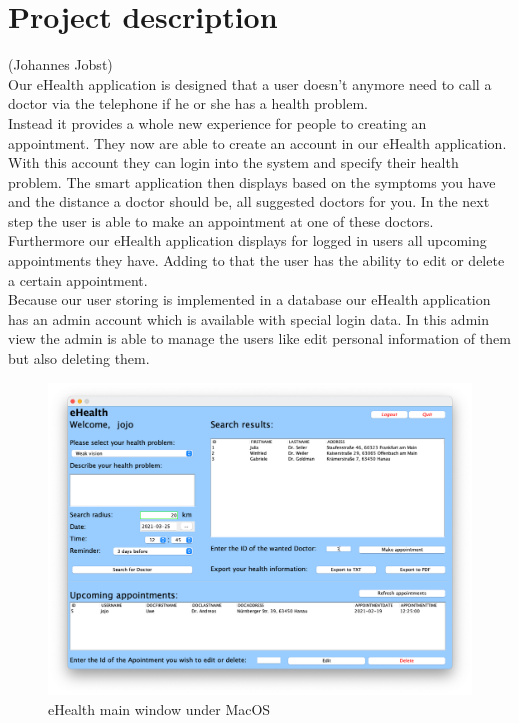 \documentclass[a4paper, 12pt]{report}
\begin{document}
\chapter{Project description}
{\tiny (Johannes Jobst)\\}
Our eHealth application is designed that a user doesn't anymore need to call a doctor via the telephone if he or she has a  health problem. \\
Instead it provides a whole new experience for people to creating an appointment. They now are able to create an account in our eHealth application. With this account they can login into the system and specify their health problem. The smart application then displays based on the symptoms you have and  the distance a doctor should be, all suggested doctors for you. In the next step the user is able to make an appointment at one of these doctors. \\
Furthermore our eHealth application displays for logged in users all upcoming appointments they have. Adding to that the user has the ability to edit or delete a certain appointment.
\\
Because our user storing is implemented in a database our eHealth application has an admin account which is available with special login data. In this admin view the admin is able to manage the users like edit personal information of them but also deleting them.
\\
\begin{figure}[!h]
\includegraphics[width=\linewidth]{main.png} 
\caption{eHealth main window under MacOS}
\end{figure}
\end{document}
